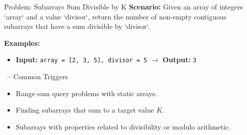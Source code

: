 \begin{frame}[fragile]{Problem: Subarrays Sum Divisible by K}
  \textbf{Scenario:}
  Given an array of integers `array` and a value `divisor`, return the number of non-empty contiguous subarrays that have a sum divisible by `divisor`.
  
  \vspace{0.3cm}
  \textbf{Examples:}
  \begin{itemize}
    \item \textbf{Input:} \texttt{array = [2, 3, 5], divisor = 5} $\rightarrow$ \textbf{Output:} \texttt{3}
  \end{itemize}
\end{frame}

\begin{frame}{\secname\ -- Common Triggers}
  \begin{itemize}
    \item Range sum query problems with static arrays.
        \item Finding subarrays that sum to a target value $K$.
        \item Subarrays with properties related to divisibility or modulo arithmetic.
  \end{itemize}
\end{frame}
